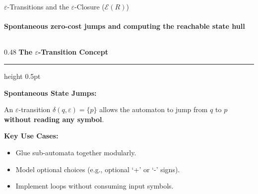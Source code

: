 \documentclass[aspectratio=169, 10pt]{beamer}
\newcommand{\colheader}[1]{%
  {\noindent\footnotesize\bfseries\color{gimpanavy}#1}%
  \vspace{0.02cm}%
  {\color{gimpanavy!30}\hrule height 0.5pt}%
  \vspace{0.05cm}%
}
\newcommand{\cardtitle}[1]{{\noindent\footnotesize\bfseries\color{gimpanavy}#1}\par\vspace{0.03cm}}
\begin{document}
\begin{frame}{$\varepsilon$-Transitions and the $\varepsilon$-Closure ($\mathcal{E}(R)$)}
  \framesubtitle{Spontaneous zero-cost jumps and computing the reachable state hull}
  
  \begin{columns}[T]
    \begin{column}{0.48\textwidth}
      \colheader{The $\varepsilon$-Transition Concept}
      \begin{tcolorbox}[conceptcard]
        \cardtitle{Spontaneous State Jumps:}
        {\scriptsize
        An $\varepsilon$-transition $\delta(q, \varepsilon) = \{p\}$ allows the automaton to jump from $q$ to $p$ \textbf{without reading any symbol}.
        \vspace{0.04cm}
        
        \textbf{Key Use Cases:}
        \begin{itemize}\setlength{\itemsep}{1.5pt}\scriptsize
          \item Glue sub-automata together modularly.
          \item Model optional choices (e.g., optional `+' or `-' signs).
          \item Implement loops without consuming input symbols.
        \end{itemize}
        }
      \end{tcolorbox}
    \end{column}
    

\end{columns}
\end{frame}
\end{document}
